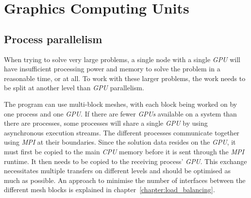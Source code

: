 \chapter{Graphics Computing Units} \label{chapter:graphics_computing_units} 

\section{Process parallelism} \label{section:process_parallelism}
When trying to solve very large problems, a single node with a single \textit{GPU} will have
insufficient processing power and memory to solve the problem in a reasonable time, or at all. To
work with these larger problems, the work needs to be split at another level than \textit{GPU}
parallelism. 

The program can use multi-block meshes, with each block being worked on by one process and one
\textit{GPU}. If there are fewer \textit{GPUs} available on a system than there are processes, some
processes will share a single \textit{GPU} by using asynchronous execution streams. The different
processes communicate together using \textit{MPI} at their boundaries. Since the solution data
resides on the \textit{GPU}, it must first be copied to the main \textit{CPU} memory before it is
sent through the \textit{MPI} runtime. It then needs to be copied to the receiving process'
\textit{GPU}. This exchange necessitates multiple transfers on different levels and should be
optimised as much as possible. An approach to minimise the number of interfaces between the
different mesh blocks is explained in chapter~\ref{chapter:load_balancing}.